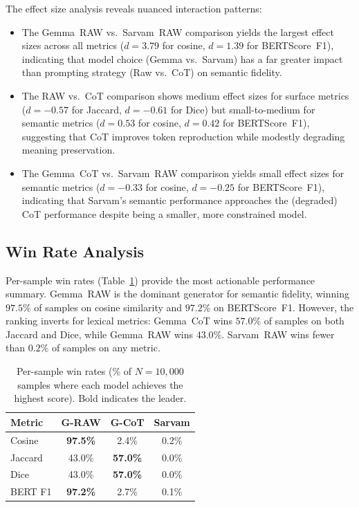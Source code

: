 \documentclass[11pt]{article}
\begin{document}
The effect size analysis reveals nuanced interaction patterns:

\begin{itemize}[leftmargin=*,itemsep=2pt]
    \item The Gemma~RAW vs.\ Sarvam~RAW comparison yields the largest effect sizes across all metrics ($d = 3.79$ for cosine, $d = 1.39$ for BERTScore~F1), indicating that model choice (Gemma vs.\ Sarvam) has a far greater impact than prompting strategy (Raw vs.\ CoT) on semantic fidelity.
    
    \item The RAW vs.\ CoT comparison shows medium effect sizes for surface metrics ($d = -0.57$ for Jaccard, $d = -0.61$ for Dice) but small-to-medium for semantic metrics ($d = 0.53$ for cosine, $d = 0.42$ for BERTScore~F1), suggesting that CoT improves token reproduction while modestly degrading meaning preservation.
    
    \item The Gemma~CoT vs.\ Sarvam~RAW comparison yields small effect sizes for semantic metrics ($d = -0.33$ for cosine, $d = -0.25$ for BERTScore~F1), indicating that Sarvam's semantic performance approaches the (degraded) CoT performance despite being a smaller, more constrained model.
\end{itemize}

\subsection{Win Rate Analysis}
\label{subsec:winrate}

Per-sample win rates (Table~\ref{tab:winrates}) provide the most actionable performance summary. Gemma~RAW is the dominant generator for semantic fidelity, winning $97.5\%$ of samples on cosine similarity and $97.2\%$ on BERTScore~F1. However, the ranking inverts for lexical metrics: Gemma~CoT wins $57.0\%$ of samples on both Jaccard and Dice, while Gemma~RAW wins $43.0\%$. Sarvam~RAW wins fewer than $0.2\%$ of samples on any metric.

\begin{table}[t]
\centering
\small
\begin{tabular}{@{}l ccc@{}}
\toprule
\textbf{Metric} & \textbf{G-RAW} & \textbf{G-CoT} & \textbf{Sarvam} \\
\midrule
Cosine     & \textbf{97.5\%} & 2.4\% & 0.2\% \\
Jaccard    & 43.0\% & \textbf{57.0\%} & 0.0\% \\
Dice       & 43.0\% & \textbf{57.0\%} & 0.0\% \\
BERT F1    & \textbf{97.2\%} & 2.7\% & 0.1\% \\
\bottomrule
\end{tabular}
\caption{Per-sample win rates (\% of $N{=}10{,}000$ samples where each model achieves the highest score). Bold indicates the leader.}
\label{tab:winrates}
\end{table}
\end{document}
